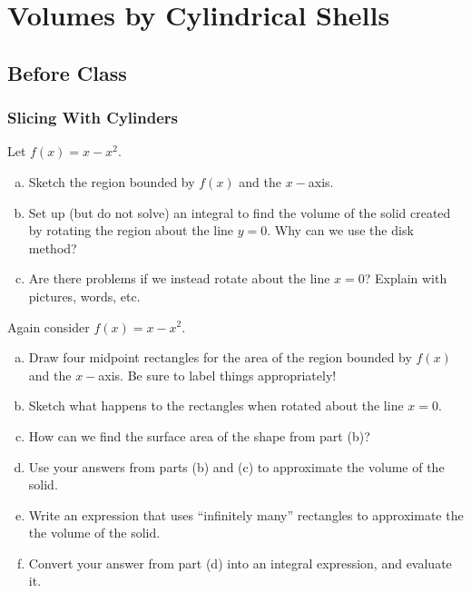 \documentclass[notes]{subfiles}
\begin{document}
	\fancyhead[LO,RE]{\bfseries \currentname}
	\fancyfoot[C]{{}}
	\fancyfoot[RO,LE]{\large \thepage}	%
	
\section*{Volumes by Cylindrical Shells}\label{cs53}
	\subsection*{Before Class}
	\subsubsection*{Slicing With Cylinders}
		\begin{ex}
			Let $f(x) = x-x^2$.
			\begin{enumerate}[(a)]
				\item Sketch the region bounded by $f(x)$ and the $x-$axis.
				\item Set up (but do not solve) an integral to find the volume of the solid created by rotating the region about the line $y = 0$.  Why can we use the disk method?
				\item Are there problems if we instead rotate about the line $x = 0$?  Explain with pictures, words, etc.
			\end{enumerate}
		\end{ex}

			\newpage
			
		\begin{ex}
			Again consider $f(x) = x-x^2$.
			\begin{enumerate}[(a)]
				\item Draw four midpoint rectangles for the area of the region bounded by $f(x)$ and the $x-$axis.  Be sure to label things appropriately!
					\vs{2}
					
				\item Sketch what happens to the rectangles when rotated about the line $x = 0$.
					\vs{1.5}
					
				\item How can we find the surface area of the shape from part (b)?  
					\vs{1}
					\newpage
					
				\item Use your answers from parts (b) and (c) to approximate the volume of the solid.
					\vs{2}
					
				\item Write an expression that uses ``infinitely many'' rectangles to approximate the the volume of the solid.
					\vs{1}
					
				\item Convert your answer from part (d) into an integral expression, and evaluate it.
					\vs{2}
			\end{enumerate}
		\end{ex}
			\newpage
	
\end{document}
